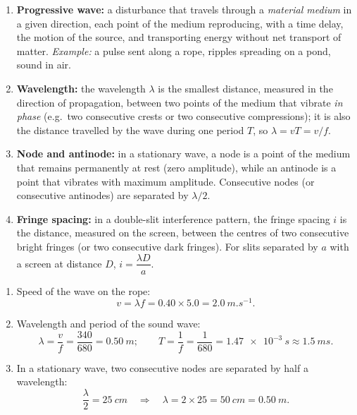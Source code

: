 \documentclass[11pt]{article}
\newcommand{\cle}[1]{{\popxbold\color{popdark}#1}}
\begin{document}
\begin{corrige}
\begin{enumerate}
\item \textbf{Progressive wave:} a disturbance that travels through a \emph{material medium} in a given direction, each point of the medium reproducing, with a time delay, the motion of the source, and transporting energy without net transport of matter. \emph{Example:} a pulse sent along a rope, ripples spreading on a pond, sound in air.
\item \textbf{Wavelength:} the wavelength $\lambda$ is the smallest distance, measured in the direction of propagation, between two points of the medium that vibrate \emph{in phase} (e.g.\ two consecutive crests or two consecutive compressions); it is also the distance travelled by the wave during one period $T$, so $\lambda = vT = v/f$.
\item \textbf{Node and antinode:} in a stationary wave, a \cle{node} is a point of the medium that remains permanently at rest (zero amplitude), while an \cle{antinode} is a point that vibrates with maximum amplitude. Consecutive nodes (or consecutive antinodes) are separated by $\lambda/2$.
\item \textbf{Fringe spacing:} in a double-slit interference pattern, the fringe spacing $i$ is the distance, measured on the screen, between the centres of two consecutive bright fringes (or two consecutive dark fringes). For slits separated by $a$ with a screen at distance $D$, $i = \dfrac{\lambda D}{a}$.
\end{enumerate}
\end{corrige}

\begin{corrige}
\begin{enumerate}
\item Speed of the wave on the rope:
\[ v = \lambda f = 0.40 \times 5.0 = \SI{2.0}{m.s^{-1}}. \]
\item Wavelength and period of the sound wave:
\[ \lambda = \frac{v}{f} = \frac{340}{680} = \SI{0.50}{m}; \qquad T = \frac{1}{f} = \frac{1}{680} = \SI{1.47e-3}{s} \approx \SI{1.5}{ms}. \]
\item In a stationary wave, two consecutive nodes are separated by half a wavelength:
\[ \frac{\lambda}{2} = \SI{25}{cm} \quad\Longrightarrow\quad \lambda = 2 \times 25 = \SI{50}{cm} = \SI{0.50}{m}. \]
\end{enumerate}
\end{corrige}
\end{document}
